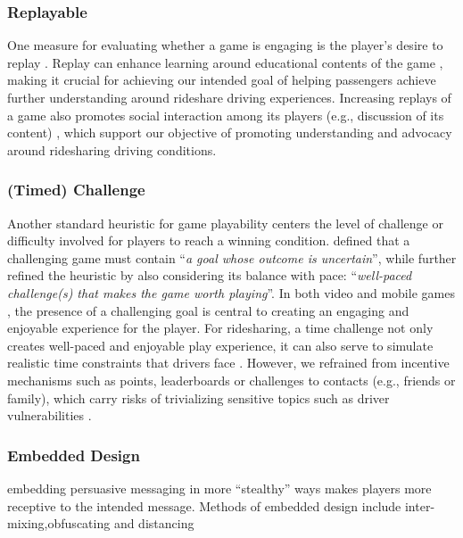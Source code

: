 \subsubsection{Replayable} \label{replayable}
One measure for evaluating whether a game is engaging is the player's desire to replay \cite{HEP}. Replay can enhance learning around educational contents of the game \cite{edu_replay}, making it crucial for achieving our intended goal of helping passengers achieve further understanding around rideshare driving experiences. Increasing replays of a game also promotes social interaction among its players (e.g., discussion of its content) \cite{replayability}, which support our objective of promoting understanding and advocacy around ridesharing driving conditions.

\subsubsection{(Timed) Challenge} \label{challenge} Another standard heuristic for game playability centers the level of challenge or difficulty involved for players to reach a winning condition. \citet{malone} defined that a challenging game must contain ``\textit{a goal whose outcome is uncertain}'', while \citet{play} further refined the heuristic by also considering its balance with pace: ``\textit{well-paced challenge(s) that makes the game worth playing}''. In both video and mobile games \cite{HEP, mobile}, the presence of a challenging goal is central to creating an engaging and enjoyable experience for the player. For ridesharing, a time challenge not only creates well-paced and enjoyable play experience, it can also serve to simulate realistic time constraints that drivers face \cite{stressfulride}. However, we refrained from incentive mechanisms such as points, leaderboards or challenges to contacts (e.g., friends or family), which carry risks of trivializing sensitive topics such as driver vulnerabilities \cite{ensitive, standbyme}.

\subsubsection{Embedded Design}
\citet{kaufman2stealth}  embedding persuasive messaging in more  ``stealthy'' ways makes players more receptive to the intended message. Methods of embedded design include inter-mixing,obfuscating and distancing
